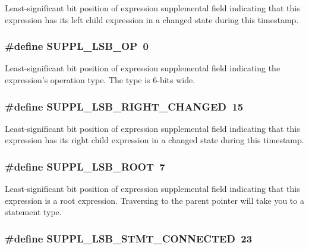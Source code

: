 Least-significant bit position of expression supplemental field indicating that this expression has its left child expression in a changed state during this timestamp. 
\subsubsection{\setlength{\rightskip}{0pt plus 5cm}\#define SUPPL\_\-LSB\_\-OP\ 0}\label{group__expr__suppl_a0}


Least-significant bit position of expression supplemental field indicating the expression's operation type. The type is 6-bits wide. 
\subsubsection{\setlength{\rightskip}{0pt plus 5cm}\#define SUPPL\_\-LSB\_\-RIGHT\_\-CHANGED\ 15}\label{group__expr__suppl_a10}


Least-significant bit position of expression supplemental field indicating that this expression has its right child expression in a changed state during this timestamp. 
\subsubsection{\setlength{\rightskip}{0pt plus 5cm}\#define SUPPL\_\-LSB\_\-ROOT\ 7}\label{group__expr__suppl_a2}


Least-significant bit position of expression supplemental field indicating that this expression is a root expression. Traversing to the parent pointer will take you to a statement type. 
\subsubsection{\setlength{\rightskip}{0pt plus 5cm}\#define SUPPL\_\-LSB\_\-STMT\_\-CONNECTED\ 23}\label{group__expr__suppl_a18}


